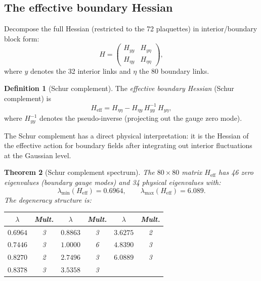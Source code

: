 \documentclass[11pt]{article}
\newtheorem{theorem}{Theorem}[section]
\theoremstyle{definition}
\newtheorem{definition}[theorem]{Definition}
\begin{document}
\subsection{The effective boundary Hessian}

Decompose the full Hessian (restricted to the 72 plaquettes) in
interior/boundary block form:
\begin{equation}\label{eq:blockH}
H=\begin{pmatrix} H_{yy} & H_{y\eta}\\ H_{\eta y} & H_{\eta\eta}
\end{pmatrix},
\end{equation}
where $y$ denotes the 32 interior links and $\eta$ the 80 boundary links.

\begin{definition}[Schur complement]\label{def:schur}
The \emph{effective boundary Hessian} (Schur complement) is
\begin{equation}\label{eq:schur}
H_{\mathrm{eff}}=H_{\eta\eta}-H_{\eta y}\,H_{yy}^{-1}\,H_{y\eta},
\end{equation}
where $H_{yy}^{-1}$ denotes the pseudo-inverse (projecting out the
gauge zero mode).
\end{definition}

The Schur complement has a direct physical interpretation: it is the
Hessian of the effective action for boundary fields after integrating
out interior fluctuations at the Gaussian level.

\begin{theorem}[Schur complement spectrum]\label{thm:schur}
The $80\times 80$ matrix $H_{\mathrm{eff}}$ has 46 zero eigenvalues
(boundary gauge modes) and 34 physical eigenvalues with:
\begin{equation}
\lambda_{\min}(H_{\mathrm{eff}})=0.6964,\qquad
\lambda_{\max}(H_{\mathrm{eff}})=6.089.
\end{equation}
The degeneracy structure is:

\begin{center}
\begin{tabular}{cccccc}
\toprule
$\lambda$ & Mult. & $\lambda$ & Mult. & $\lambda$ & Mult.\\
\midrule
$0.6964$ & 3 & $0.8863$ & 3 & $3.6275$ & 2\\
$0.7446$ & 3 & $1.0000$ & 6 & $4.8390$ & 3\\
$0.8270$ & 2 & $2.7496$ & 3 & $6.0889$ & 3\\
$0.8378$ & 3 & $3.5358$ & 3 & &\\
\bottomrule
\end{tabular}
\end{center}
\end{theorem}
\end{document}
